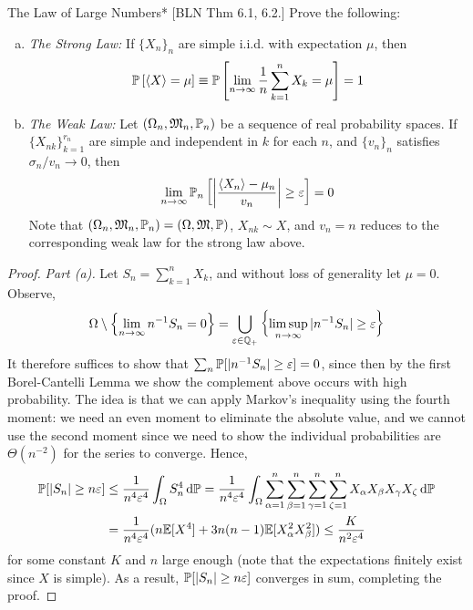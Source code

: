 \begin{problem}{The Law of Large Numbers}*
    [BLN Thm 6.1, 6.2.] Prove the following:
    \begin{enumerate}[(a)]
        \itemsep0em
        \item \emph{The Strong Law:} If \(\{X_n\}_n\) are simple i.i.d. with expectation \(\mu\), then
        \[
            \bb{P}\left[\ev{X} = \mu\right]
            \equiv \bb{P}\left[ \lim_{n \to \infty} \frac{1}{n} \sum_{k=1}^n X_k = \mu \right]
            = 1
        \]
        \item \emph{The Weak Law:} Let \((\Omega_n, \mathfrak{M}_n, \mathbb{P}_n)\) be a sequence of real probability spaces. If \(\{X_{nk}\}_{k=1}^{r_n}\) are simple and independent in \(k\) for each \(n\), and \(\{v_n\}_n\) satisfies \(\sigma_n / v_n \to 0\), then
        \[
            \lim_{n \to \infty} \bb{P}_n \left[ \left| \frac{\ev{X_n} - \mu_n}{v_n} \right| \geq \varepsilon \right] = 0
        \]
        Note that \((\Omega_n, \mathfrak{M}_n, \mathbb{P}_n) = (\Omega, \mathfrak{M}, \mathbb{P})\), \(X_{nk} \sim X\), and \(v_n = n\) reduces to the corresponding weak law for the strong law above. 
    \end{enumerate}
\end{problem}

\begin{proof}
    \emph{Part (a).} Let \(S_n = \sum_{k=1}^n X_k\), and without loss of generality let \(\mu = 0\). Observe, 
    \[
        \Omega \setminus \left\{\lim_{n \to \infty} n^{-1} S_n = 0\right\} 
        = \bigcup_{\varepsilon \in \mathbb{Q}_+} \left\{\limsup_{n \to \infty} |n^{-1} S_n| \geq \varepsilon \right\}
    \]
    It therefore suffices to show that \(\sum_n \mathbb{P}[|n^{-1} S_n| \geq \varepsilon] = 0\), since then by the first Borel-Cantelli Lemma we show the complement above occurs with high probability. The idea is that we can apply Markov's inequality using the fourth moment: we need an even moment to eliminate the absolute value, and we cannot use the second moment since we need to show the individual probabilities are \(\Theta(n^{-2})\) for the series to converge. Hence,
    \begin{align*}
        \mathbb{P}[|S_n| \geq n \varepsilon]
        &\leq \frac{1}{n^4 \varepsilon^4} \int_{\Omega} S_n^4 \, \mathrm{d}\mathbb{P} 
        = \frac{1}{n^4 \varepsilon^4} \int_{\Omega} \sum_{\alpha=1}^n \sum_{\beta=1}^n \sum_{\gamma=1}^n \sum_{\zeta=1}^n X_\alpha X_\beta X_\gamma X_\zeta \, \mathrm{d}\mathbb{P} \\
        &= \frac{1}{n^4 \varepsilon^4} (n \mathbb{E}[X^4] + 3n(n-1) \mathbb{E}[X_\alpha^2 X_\beta^2])
        \leq \frac{K}{n^2 \varepsilon^4}
    \end{align*}
    for some constant \(K\) and \(n\) large enough (note that the expectations finitely exist since \(X\) is simple). As a result, \(\mathbb{P}[|S_n| \geq n \varepsilon]\) converges in sum, completing the proof. 
\end{proof}

